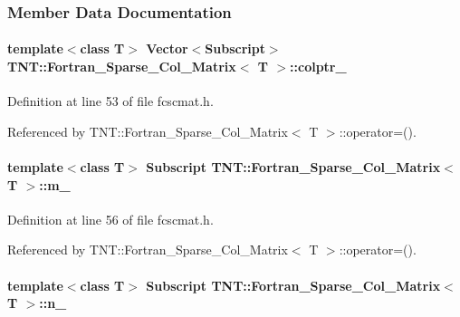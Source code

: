 \subsubsection{Member Data Documentation}
\paragraph[{colptr\_\-}]{\setlength{\rightskip}{0pt plus 5cm}template$<$class T$>$ {\bf Vector}$<${\bf Subscript}$>$ {\bf TNT::Fortran\_\-Sparse\_\-Col\_\-Matrix}$<$ T $>$::{\bf colptr\_\-}}\hfill\label{class_t_n_t_1_1_fortran___sparse___col___matrix_a45a3d26870791a4220e9a6dcf6fd73f5}


Definition at line 53 of file fcscmat.h.



Referenced by TNT::Fortran\_\-Sparse\_\-Col\_\-Matrix$<$ T $>$::operator=().

\paragraph[{m\_\-}]{\setlength{\rightskip}{0pt plus 5cm}template$<$class T$>$ {\bf Subscript} {\bf TNT::Fortran\_\-Sparse\_\-Col\_\-Matrix}$<$ T $>$::{\bf m\_\-}}\hfill\label{class_t_n_t_1_1_fortran___sparse___col___matrix_ae0e779ccb748fd33ae57a092456b46c9}


Definition at line 56 of file fcscmat.h.



Referenced by TNT::Fortran\_\-Sparse\_\-Col\_\-Matrix$<$ T $>$::operator=().

\paragraph[{n\_\-}]{\setlength{\rightskip}{0pt plus 5cm}template$<$class T$>$ {\bf Subscript} {\bf TNT::Fortran\_\-Sparse\_\-Col\_\-Matrix}$<$ T $>$::{\bf n\_\-}}\hfill\label{class_t_n_t_1_1_fortran___sparse___col___matrix_ae4527d6b3fd69f45f3acc9198c75bd7e}


